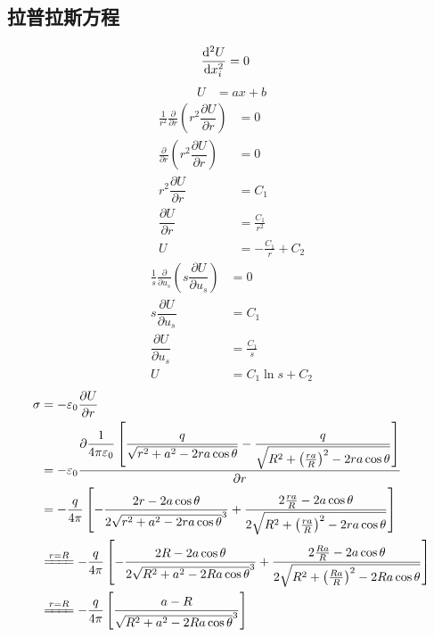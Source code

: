 \subsection{拉普拉斯方程}
\begin{align}
    \frac{\dif^2 U}{\dif x_i^2}&=0
\end{align}
\begin{align}
    U&=ax+b
\end{align}
\begin{align*}
    \frac{1}{r^2}\frac{\partial}{\partial r}\left(r^2\dfrac{{\partial U}}{\partial r}\right)&=0\\
    \frac{\partial}{\partial r}\left(r^2\dfrac{{\partial U}}{\partial r}\right)&=0\\
        r^2\dfrac{{\partial U}}{\partial r}&=C_1\\
        \dfrac{{\partial U}}{\partial r}&=\frac{C_1}{r^2}\\
        U&=-\frac{C_1}{r}+C_2
\end{align*}
\begin{align*}
    \frac{1}{s}\frac{\partial}{\partial u_s}\left(s\dfrac{{\partial U}}{\partial u_s}\right)&=0\\
    s\dfrac{{\partial U}}{\partial u_s}&=C_1\\
    \dfrac{{\partial U}}{\partial u_s}&=\frac{C_1}{s}\\
    U&=C_1\ln s+C_2
\end{align*}
\begin{align*}
    \sigma&=-\varepsilon_0\frac{\partial U}{\partial r}\\
    &=-\varepsilon_0\dfrac{\partial \dfrac{1}{4\pi\varepsilon_0}\left[\dfrac{q}{\sqrt{r^2+a^2-2ra\cos\theta}}-\dfrac{q}{\sqrt{R^2+\left(\frac{ra}{R}\right)^2-2ra\cos\theta}}\right]}{\partial r}\\
    &=-\dfrac{q}{4\pi}\left[-\dfrac{2r-2a\cos\theta}{2\sqrt{r^2+a^2-2ra\cos\theta}^3}+\dfrac{2\frac{ra}{R}-2a\cos\theta}{2\sqrt{R^2+\left(\frac{ra}{R}\right)^2-2ra\cos\theta}}\right]\\
    &\xlongequal{r=R}-\dfrac{q}{4\pi}\left[-\dfrac{2R-2a\cos\theta}{2\sqrt{R^2+a^2-2Ra\cos\theta}^3}+\dfrac{2\frac{Ra}{R}-2a\cos\theta}{2\sqrt{R^2+\left(\frac{Ra}{R}\right)^2-2Ra\cos\theta}}\right]\\
    &\xlongequal{r=R}-\dfrac{q}{4\pi}\left[\dfrac{a-R}{\sqrt{R^2+a^2-2Ra\cos\theta}^3}\right]
\end{align*}

